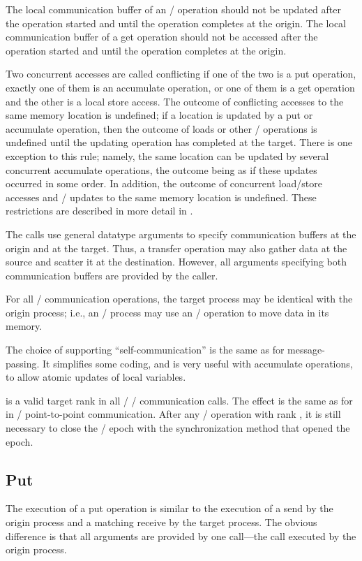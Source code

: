 The local communication buffer of an \RMA/ operation should not be updated after the operation started and
until the operation completes at the origin.
The local communication buffer of a get operation should not be accessed after the operation started and until the
operation completes at the origin.

Two concurrent accesses are called conflicting if one of the two is a put operation, exactly one of them is an
accumulate operation, or one of them is a get operation and the other is a local store access.
The outcome of conflicting
accesses to the same memory location is undefined;
if a location is updated by a put or accumulate operation, then 
the outcome of loads or other \RMA/ operations is undefined
until the updating operation has completed at the target.
There is one exception to this rule; namely, the same location can be
updated by several concurrent accumulate operations, the outcome being as
if these updates occurred in some order.  In addition, 
the outcome of concurrent load/store accesses and \RMA/ updates to the same memory location is undefined.
These restrictions
are described in more detail in
.

The calls use general datatype arguments to specify communication
buffers at the origin and at the target.  Thus, a transfer operation
may also gather data at the source and scatter it at the destination.
However, all arguments specifying both communication buffers are
provided by the caller.

For all \RMA/ communication operations, the target process may be identical with the
origin process;
i.e., an \mpi/ process may use an \RMA/ operation to move data in its memory.

\begin{rationale}
The choice of supporting ``self-communication'' is the same as for
message-passing.
It simplifies some coding, and is very useful with accumulate
operations, to allow atomic updates of local variables.
\end{rationale}

 is a valid target rank in all \MPI/ \RMA/ communication calls.  
The effect is the same as for  in \MPI/ point-to-point
communication.
After any \RMA/ operation with rank , it is still necessary to
close the \RMA/ epoch with the synchronization method that opened the epoch. 

\subsection{Put}
\label{sec:onesided-put}
The execution of a put operation is similar to the execution of a
send by the origin process and a matching receive by the target process.
The obvious difference is that all arguments are provided by one
call---the call executed by the origin process.

